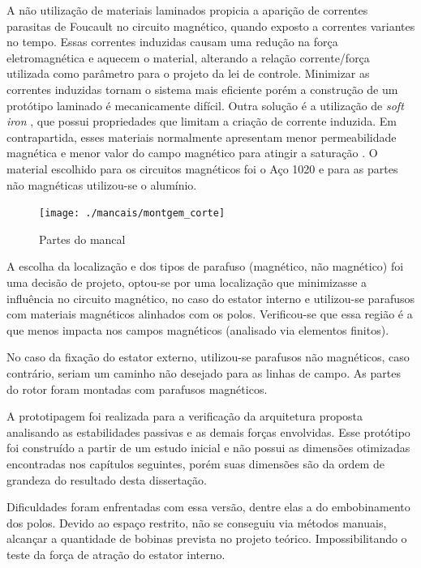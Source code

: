  
A não utilização de materiais laminados propicia a aparição de correntes parasitas de Foucault no circuito magnético, quando exposto a correntes variantes no tempo. Essas correntes induzidas  causam uma redução na força eletromagnética e aquecem o material, alterando a relação corrente/força utilizada como parâmetro para o projeto da lei de controle. Minimizar as correntes induzidas tornam o sistema mais eficiente porém a construção de um protótipo laminado é mecanicamente difícil. Outra solução é a utilização de \textit{soft iron} \citep{Boglietti2003}, que possui propriedades que limitam a criação de corrente induzida. Em contrapartida, esses materiais normalmente apresentam menor permeabilidade magnética e menor valor do campo magnético para atingir a saturação \citep{Han2013a}. O material escolhido para os circuitos magnéticos foi o Aço 1020 e para as partes não magnéticas utilizou-se o alumínio.
  
\begin{figure}[th!]
\centering
\texttt{[image: ./mancais/montgem\_corte]}
\caption{Partes do mancal}
\label{fig:montgem:corte}
\end{figure} 

A escolha da localização e dos tipos de parafuso (magnético, não magnético) foi uma decisão de projeto, optou-se por uma localização que minimizasse a influência no circuito magnético, no caso do estator interno e utilizou-se parafusos com materiais magnéticos alinhados com os polos. Verificou-se que essa região é a que menos impacta nos campos magnéticos (analisado via elementos finitos).

No caso da fixação do estator externo, utilizou-se parafusos não magnéticos, caso contrário, seriam um caminho não desejado para as linhas de campo. As partes do rotor foram montadas com parafusos magnéticos.

A prototipagem foi realizada para a verificação da arquitetura proposta analisando as estabilidades passivas e as demais forças envolvidas. Esse protótipo foi construído a partir de um estudo inicial e não possui as dimensões otimizadas encontradas nos capítulos seguintes, porém suas dimensões são da ordem de grandeza do resultado desta dissertação.

Dificuldades foram enfrentadas com essa versão, dentre elas a do embobinamento dos polos. Devido ao espaço restrito, não se conseguiu via métodos manuais, alcançar a quantidade de bobinas prevista no projeto teórico. Impossibilitando o teste da força de atração do estator interno.

